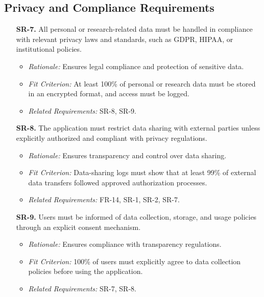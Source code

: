 \documentclass[12pt]{article}
\begin{document}
\subsection{Privacy and Compliance Requirements}
\begin{enumerate}
  \item[\textbf{SR-7.}] All personal or research-related data must be handled in 
  compliance with relevant privacy laws and standards, such as GDPR, HIPAA, or 
  institutional policies.
  \begin{itemize}
    \item \textit{Rationale:} Ensures legal compliance and protection of 
    sensitive data.
    \item \textit{Fit Criterion:} At least 100\% of personal or research data 
    must be stored in an encrypted format, and access must be logged.
    \item \textit{Related Requirements:} SR-8, SR-9.
  \end{itemize}

  \item[\textbf{SR-8.}] The application must restrict data sharing with external 
  parties unless explicitly authorized and compliant with privacy regulations.
  \begin{itemize}
    \item \textit{Rationale:} Ensures transparency and control over data 
    sharing.
    \item \textit{Fit Criterion:} Data-sharing logs must show that at least 99\% 
    of external data transfers followed approved authorization processes.
    \item \textit{Related Requirements:} FR-14, SR-1, SR-2, SR-7.
  \end{itemize}

  \item[\textbf{SR-9.}] Users must be informed of data collection, storage, and 
  usage policies through an explicit consent mechanism.
  \begin{itemize}
    \item \textit{Rationale:} Ensures compliance with transparency regulations.
    \item \textit{Fit Criterion:} 100\% of users must explicitly agree 
    to data collection policies before using the application.
    \item \textit{Related Requirements:} SR-7, SR-8.
  \end{itemize}
\end{enumerate}
\end{document}
